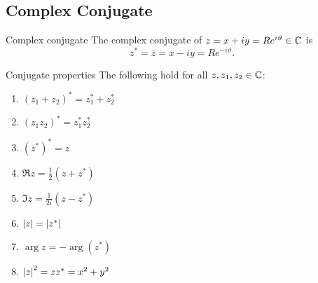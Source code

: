 \documentclass{article}
\begin{document}
    \subsection{Complex Conjugate}
    \begin{definition}{Complex conjugate}{}
        The complex conjugate of \(z = x + iy = Re^{i\vartheta}\in\mathbb{C}\) is
        \[z^* = \bar{z} = x - iy = Re^{-i\vartheta}.\]
    \end{definition}
    \begin{lemma}{Conjugate properties}{}
        The following hold for all \(z, z_1, z_2\in\mathbb{C}\):
        \begin{enumerate}
            \item \((z_1 + z_2)^* = z_1^* + z_2^*\)
            \item \((z_1z_2)^* = z_1^*z_2^*\)
            \item \((z^*)^* = z\)
            \item \(\Re z = \frac{1}{2}(z + z^*)\)
            \item \(\Im z = \frac{1}{2i}(z - z^*)\)
            \item \(\abs{z} = \abs{z^*}\)
            \item \(\arg z = -\arg (z^*)\)
            \item \(\abs{z}^2 = zz^* = x^2 + y^2\)
        \end{enumerate}
    \end{lemma}
\end{document}
